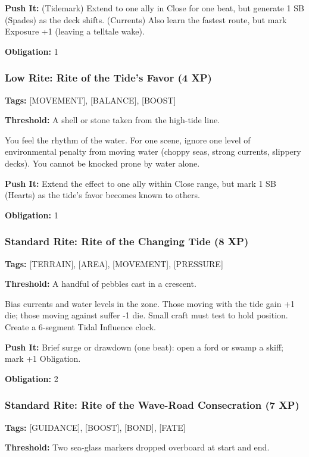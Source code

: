 \textbf{Push It:} (Tidemark) Extend to one ally in Close for one beat, but generate 1 SB (Spades) as the deck shifts. (Currents) Also learn the fastest route, but mark Exposure +1 (leaving a telltale wake).

\textbf{Obligation:} 1

\subsubsection{Low Rite: Rite of the Tide's Favor (4 XP)}

\textbf{Tags:} [MOVEMENT], [BALANCE], [BOOST]

\textbf{Threshold:} A shell or stone taken from the high-tide line.

You feel the rhythm of the water. For one scene, ignore one level of environmental penalty from moving water (choppy seas, strong currents, slippery decks). You cannot be knocked prone by water alone.

\textbf{Push It:} Extend the effect to one ally within Close range, but mark 1 SB (Hearts) as the tide's favor becomes known to others.

\textbf{Obligation:} 1

\subsubsection{Standard Rite: Rite of the Changing Tide (8 XP)}

\textbf{Tags:} [TERRAIN], [AREA], [MOVEMENT], [PRESSURE]

\textbf{Threshold:} A handful of pebbles cast in a crescent.

Bias currents and water levels in the zone. Those moving with the tide gain +1 die; those moving against suffer -1 die. Small craft must test to hold position. Create a 6-segment Tidal Influence clock.

\textbf{Push It:} Brief surge or drawdown (one beat): open a ford or swamp a skiff; mark +1 Obligation.

\textbf{Obligation:} 2

\subsubsection{Standard Rite: Rite of the Wave-Road Consecration (7 XP)}

\textbf{Tags:} [GUIDANCE], [BOOST], [BOND], [FATE]

\textbf{Threshold:} Two sea-glass markers dropped overboard at start and end.

